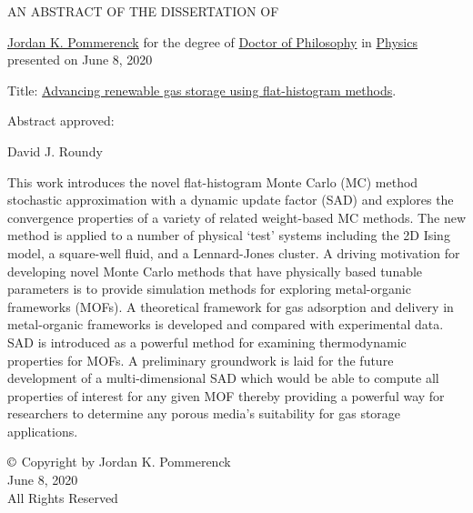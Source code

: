 \thispagestyle{empty}
\begin{center}
	\large
	AN ABSTRACT OF THE DISSERTATION OF
\end{center}


\justify{}
\underline{Jordan K. Pommerenck} for the degree of \underline{Doctor of Philosophy} in \underline{Physics}
presented on June 8, 2020
\vspace{1.0cm}

\justify{}
Title: \underline{Advancing renewable gas storage using flat-histogram methods}.
\vspace{2.0cm}

\justify{}
Abstract approved:
\underline{\hspace{11cm}}
\vspace{0.1cm}

\hspace{7.0cm} David J. Roundy
\vspace{1.0cm}

\justify{}
\doublespacing
This work introduces the novel flat-histogram Monte
Carlo (MC) method stochastic approximation with a dynamic update factor (SAD) and explores the convergence properties of a
variety of related weight-based MC methods. The new method is applied
to a number of physical `test’ systems including the 2D Ising model, a
square-well fluid, and a Lennard-Jones cluster. A driving motivation for
developing novel Monte Carlo methods that have physically based tunable
parameters is to provide simulation methods for exploring metal-organic
frameworks (MOFs). A theoretical framework for gas adsorption and
delivery in metal-organic frameworks is developed and compared with
experimental data. SAD is introduced as a powerful method for examining
thermodynamic properties for MOFs. A preliminary groundwork is laid for
the future development of a multi-dimensional SAD which would be able
to compute all properties of interest for any given MOF thereby providing a powerful way for researchers to determine any porous media's suitability for gas storage applications.

\newpage{}
\thispagestyle{empty}
\singlespacing

\vspace*{4.0cm}
\begin{center}
$\copyright$ Copyright by Jordan K. Pommerenck \\
June 8, 2020 \\
All Rights Reserved
\end{center}

